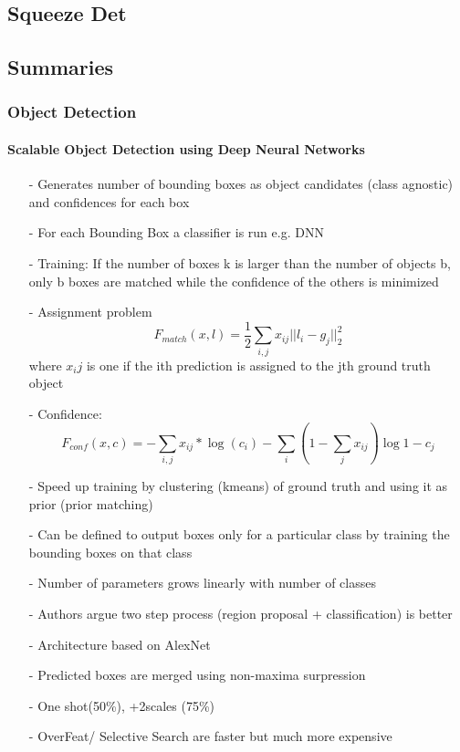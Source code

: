\documentclass{article}
\begin{document}
	\subsection{Squeeze Det \cite{Wu}}
		
	\subsection{Summaries}
	\subsubsection{Object Detection}
		\paragraph{Scalable Object Detection using Deep Neural Networks\cite{Erhan}}
		\begin{itemize}
			\item[-] Generates number of bounding boxes as object candidates (class agnostic) and confidences for each box
			\item[-] For each Bounding Box a classifier is run e.g. DNN
			\item[-] Training: If the number of boxes k is larger than the number of objects b, only b boxes are matched while the confidence of the others is minimized
			\item[-] Assignment problem $$F_{match}(x,l) = \frac{1}{2}\sum_{i,j}x_{ij}||l_i - g_j||^2_2$$ where $x_ij$ is one if the ith prediction is assigned to the jth ground truth object
			\item[-] Confidence: 
			$$F_{conf}(x,c) = - \sum_{i,j}x_{ij}*\log(c_i)-\sum_{i}(1-\sum_{j}x_{ij})\log{1-c_j}$$
			\item[-] Speed up training by clustering (kmeans) of ground truth and using it as prior (prior matching)
			\item[-] Can be defined to output boxes only for a particular class by training the bounding boxes on that class
			\item[-] Number of parameters grows linearly with number of classes
			\item[-] Authors argue two step process (region proposal + classification) is better
			\item[-] Architecture based on AlexNet
			\item[-] Predicted boxes are merged using non-maxima surpression
			\item[-] One shot(50\%), +2scales (75\%)
			\item[-] OverFeat/ Selective Search are faster but much more expensive
		\end{itemize}
\end{document}
